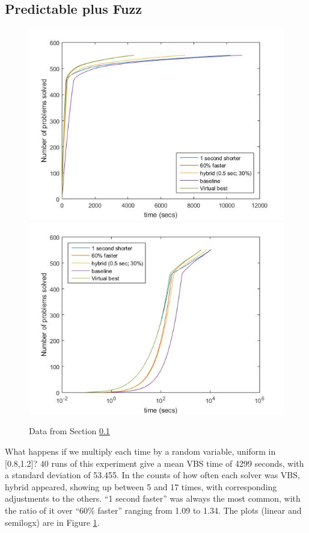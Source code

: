 \documentclass{easychair}
\begin{document}
\subsection{Predictable plus Fuzz}\label{sec:P+f}
\begin{figure}[h]
\caption{Data from Section \ref{sec:P+f}\label{Fig:S3}}
\includegraphics[scale=0.60]{Fig3a.jpg}
\includegraphics[scale=0.60]{Fig3b.jpg}
\end{figure}
What happens if we multiply each time by a random variable, uniform in [0.8,1.2]? 
40 runs of this experiment give a mean VBS time of 4299 seconds, with a standard deviation of 53.455. In the counts of how often each solver was VBS, hybrid appeared, showing up between 5 and 17 times, with corresponding adjustments to the others. ``1 second faster'' was always the most common, with the ratio of it over ``60\% faster'' ranging from 1.09 to 1.34. The plots (linear and semilogx) are in Figure \ref{Fig:S3}.
\end{document}
